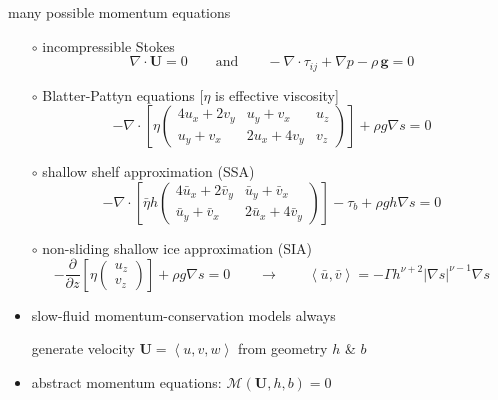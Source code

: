 \documentclass[xcolor={dvipsnames}]{beamer}
\newcommand\bU{\mathbf{U}}
\newcommand\Div{\nabla\cdot}
\newcommand\grad{\nabla}
\newcommand{\ip}[2]{\ensuremath{\left<#1,#2\right>}}
\begin{document}
\begin{frame}{many possible momentum equations}

  \begin{itemize}
  \scriptsize
  \item[$\circ$] incompressible Stokes
\begin{equation*}
  \nabla \cdot \bU = 0 \qquad \text{and} \qquad - \nabla \cdot \tau_{ij} + \nabla p - \rho\, \mathbf{g} = 0
\end{equation*}
  \item[$\circ$] Blatter-Pattyn equations [$\eta$ is effective viscosity]
$$-\Div \left[\eta \begin{pmatrix}
4 u_x+2v_y & u_y+v_x   & u_z \\
u_y+v_x    & 2u_x+4v_y & v_z
\end{pmatrix} \right] + \rho g \grad s = 0$$
  \item[$\circ$] shallow shelf approximation (SSA)
$$-\Div \left[\bar \eta h \begin{pmatrix}
4 \bar u_x+2\bar v_y & \bar u_y+\bar v_x   \\
\bar u_y+\bar v_x    & 2\bar u_x+4\bar v_y
\end{pmatrix} \right] - \tau_b + \rho g h \grad s = 0$$
  \item[$\circ$] non-sliding shallow ice approximation (SIA)
$$-\frac{\partial}{\partial z} \left[\eta \begin{pmatrix}
u_z \\
v_z
\end{pmatrix} \right] + \rho g \grad s = 0
\qquad \to \qquad
\ip{\bar u}{\bar v} = -\Gamma h^{\nu+2} |\grad s|^{\nu-1} \grad s$$
  \end{itemize}

\begin{itemize}
\item slow-fluid momentum-conservation models always
\begin{center}
\alert{generate velocity $\bU=\left<u,v,w\right>$ from geometry $h$ \& $b$}
\end{center}
\item abstract momentum equations: \qquad $\mathcal{M}(\bU,h,b)=0$
\end{itemize}
\end{frame}
\end{document}
